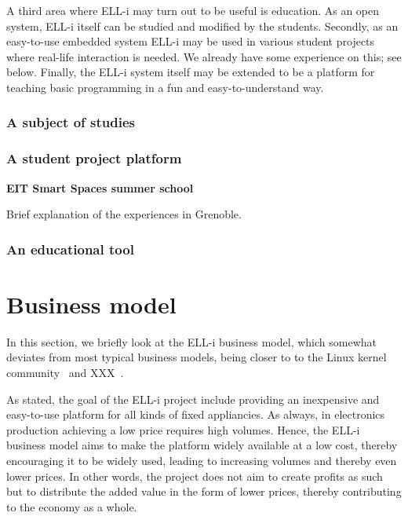 \documentclass[draft,a4paper]{siamltex}
\begin{document}
A third area where ELL-i may turn out to be useful is education.  As
an open system, ELL-i itself can be studied and modified by the
students.  Secondly, as an easy-to-use embedded system ELL-i may be
used in various student projects where real-life interaction is
needed.  We already have some experience on this; see below.  Finally,
the ELL-i system itself may be extended to be a platform for teaching
basic programming in a fun and easy-to-understand way.

\subsubsection{A subject of studies}


\subsubsection{A student project platform}

{\bf EIT Smart Spaces summer school}

Brief explanation of the experiences in Grenoble.

\subsubsection{An educational tool}

 

\section{Business model}
\label{sec:business}

In this section, we briefly look at the ELL-i business model, which
somewhat deviates from most typical business models, being closer to
to the Linux kernel community~\cite{Linux-kernel-need-reference}
and XXX~\cite{Something-else-need-reference}.

As stated, the goal of the ELL-i project include providing an
inexpensive and easy-to-use platform for all kinds of fixed
appliancies.  As always, in electronics production achieving a low
price requires high volumes.  Hence, the ELL-i business model aims to
make the platform widely available at a low cost, thereby encouraging
it to be widely used, leading to increasing volumes and thereby even
lower prices.  In other words, the project does not aim to
create profits as such but to distribute the added value in the form
of lower prices, thereby contributing to the economy as a whole.
\end{document}
